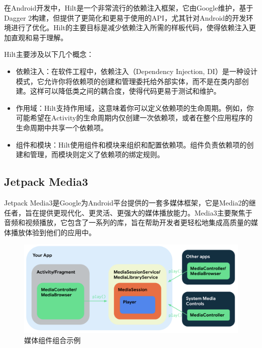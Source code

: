 \documentclass[main.tex]{subfiles}
\begin{document}
在Android开发中，Hilt是一个非常流行的依赖注入框架，它由Google维护，基于Dagger 2构建，但提供了更简化和更易于使用的API，尤其针对Android的开发环境进行了优化。Hilt的主要目标是减少依赖注入所需的样板代码，使得依赖注入更加直观和易于理解。

Hilt主要涉及以下几个概念：
\begin{itemize}
    \item 依赖注入：在软件工程中，依赖注入（Dependency Injection, DI）是一种设计模式，它允许你将依赖项的创建和管理委托给外部实体，而不是在类内部创建。这样可以降低类之间的耦合度，使得代码更易于测试和维护。
    \item 作用域：Hilt支持作用域，这意味着你可以定义依赖项的生命周期。例如，你可能希望在Activity的生命周期内仅创建一次依赖项，或者在整个应用程序的生命周期中共享一个依赖项。
    \item 组件和模块：Hilt使用组件和模块来组织和配置依赖项。组件负责依赖项的创建和管理，而模块则定义了依赖项的绑定规则。
\end{itemize}

\subsection{Jetpack Media3}

Jetpack Media3是Google为Android平台提供的一套多媒体框架，它是Media2的继任者，旨在提供更现代化、更灵活、更强大的媒体播放能力。Media3主要聚焦于音频和视频播放，它包含了一系列的库，旨在帮助开发者更轻松地集成高质量的媒体播放体验到他们的应用中。

\begin{figure}[htbp]
    \centering
    \includegraphics[width=0.9\linewidth]{assets/media-components.png}
    \caption{媒体组件组合示例}
    \label{fig:media-components}
\end{figure}
\end{document}
